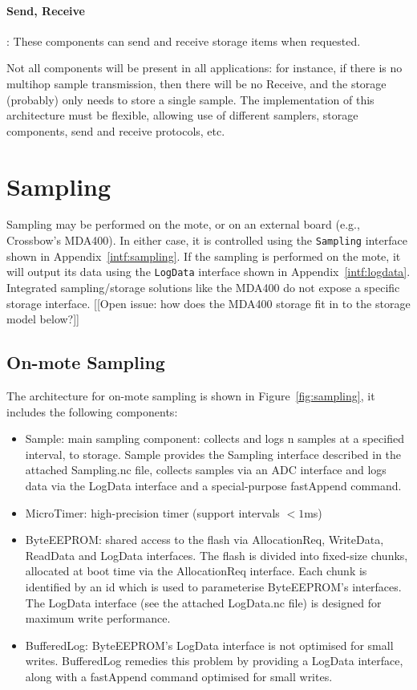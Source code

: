 \documentclass{article}
\newcommand{\code}[1]{{\tt #1}}
\begin{document}
\paragraph{Send, Receive}: These components can send and receive storage
items when requested.

Not all components will be present in all applications: for instance, if
there is no multihop sample transmission, then there will be no Receive,
and the storage (probably) only needs to store a single sample. The
implementation of this architecture must be flexible, allowing use of 
different samplers, storage components, send and receive protocols, etc.

\section{Sampling}

Sampling may be performed on the mote, or on an external board (e.g.,
Crossbow's MDA400). In either case, it is controlled using the
\code{Sampling} interface shown in Appendix~\ref{intf:sampling}. If
the sampling is performed on the mote, it will output its data using
the \code{LogData} interface shown in Appendix~\ref{intf:logdata}.
Integrated sampling/storage solutions like the MDA400 do not
expose a specific storage interface. [[Open issue: how does the MDA400
storage fit in to the storage model below?]]

\subsection{On-mote Sampling}

The architecture for on-mote sampling is shown in
Figure~\ref{fig:sampling}, it includes the following components:

\begin{itemize}
  
\item Sample: main sampling component: collects and logs n samples at a 
specified interval, to storage. Sample provides the Sampling interface
described in the attached Sampling.nc file, collects samples via an
ADC interface and logs data via the LogData interface and a special-purpose
fastAppend command.

\item MicroTimer: high-precision timer (support intervals $<1$ms)

\item ByteEEPROM: shared access to the flash via AllocationReq, WriteData,
ReadData and LogData interfaces. The flash is divided into fixed-size
chunks, allocated at boot time via the AllocationReq interface. Each chunk
is identified by an id which is used to parameterise ByteEEPROM's
interfaces. The LogData interface  (see the attached LogData.nc file)
is designed for maximum write performance.

\item BufferedLog: ByteEEPROM's LogData interface is not optimised for
small writes. BufferedLog remedies this problem by providing a LogData
interface, along with a fastAppend command optimised for small writes.

\end{itemize}
\end{document}
